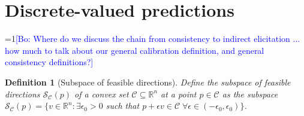 \documentclass{article}
\newcommand{\Comments}{1}
\newcommand{\mynote}[2]{\ifnum\Comments=1\textcolor{#1}{#2}\fi}
\newcommand{\raf}[1]{\mynote{green}{[RF: #1]}}
\newcommand{\bo}[1]{\mynote{blue}{[Bo: #1]}}
\newcommand{\reals}{\mathbb{R}}
\newcommand{\simplex}{\Delta_\Y}
\newcommand{\C}{\mathcal{C}}
\newcommand{\R}{\mathcal{R}}
\renewcommand{\S}{\mathcal{S}}
\newcommand{\Y}{\mathcal{Y}}
\newtheorem{lemma}{Lemma}
\newtheorem{definition}{Definition}
\begin{document}
\section{Discrete-valued predictions}\label{sec:finite-calib}

\bo{Where do we discuss the chain from consistency to indirect elicitation ... how much to talk about our general calibration definition, and general consistency definitions?}


\begin{definition}[Subspace of feasible directions]
	Define the \emph{subspace of feasible directions} $\S_\C(p)$ of a convex set $\C \subseteq \reals^n$ at a point $p \in \C$ as the subspace $\S_\C(p) = \{ v \in \reals^n : \exists \epsilon_0 > 0 $ such that $p + \epsilon v \in \C \; \forall \epsilon \in (-\epsilon_0,\epsilon_0) \}$.
\end{definition}
\end{document}
